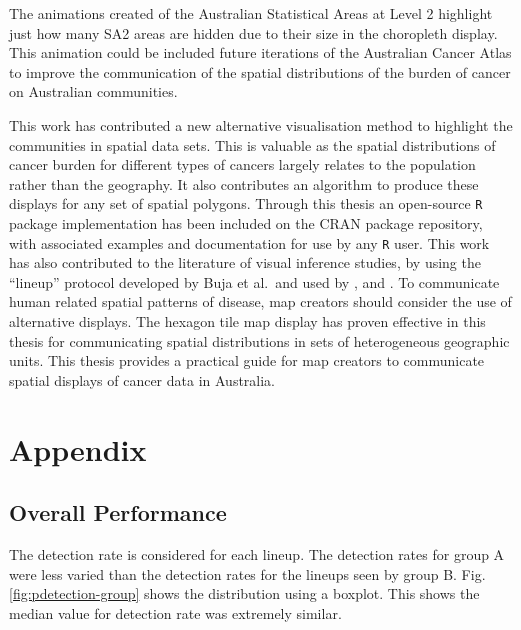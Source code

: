 \documentclass{monashthesis}
\begin{document}
The animations created of the Australian Statistical Areas at Level 2 highlight just how many SA2 areas are hidden due to their size in the choropleth display. This animation could be included future iterations of the Australian Cancer Atlas to improve the communication of the spatial distributions of the burden of cancer on Australian communities.

This work has contributed a new alternative visualisation method to highlight the communities in spatial data sets. This is valuable as the spatial distributions of cancer burden for different types of cancers largely relates to the population rather than the geography. It also contributes an algorithm to produce these displays for any set of spatial polygons. Through this thesis an open-source \texttt{R} package implementation has been included on the CRAN package repository, with associated examples and documentation for use by any \texttt{R} user.
This work has also contributed to the literature of visual inference studies, by using the ``lineup'' protocol developed by Buja et al.~and used by \textcite{GIIV}, and \textcite{GTPCCD}.
To communicate human related spatial patterns of disease, map creators should consider the use of alternative displays. The hexagon tile map display has proven effective in this thesis for communicating spatial distributions in sets of heterogeneous geographic units. This thesis provides a practical guide for map creators to communicate spatial displays of cancer data in Australia.

\printbibliography[heading=bibintoc]

\appendix
\renewcommand\thesubsection{\thesection.\Alph{subsection}}

\hypertarget{appendix}{%
\chapter{Appendix}\label{appendix}}

\hypertarget{overall-performance}{%
\section{Overall Performance}\label{overall-performance}}

The detection rate is considered for each lineup. The detection rates for group A were less varied than the detection rates for the lineups seen by group B. Fig. \ref{fig:pdetection-group} shows the distribution using a boxplot. This shows the median value for detection rate was extremely similar.
\end{document}
